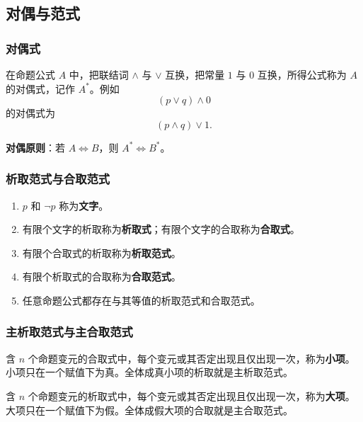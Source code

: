 \subsection{对偶与范式}

\subsubsection{对偶式}

在命题公式 \(A\) 中，把联结词 \(\land\) 与 \(\lor\) 互换，把常量 \(1\) 与 \(0\) 互换，所得公式称为 \(A\) 的对偶式，记作 \(A^*\)。例如
\[
(p\lor q)\land0
\]
的对偶式为
\[
(p\land q)\lor1.
\]

\textbf{对偶原则}：若 \(A\Leftrightarrow B\)，则 \(A^*\Leftrightarrow B^*\)。

\subsubsection{析取范式与合取范式}

\begin{enumerate}
	\item \(p\) 和 \(\neg p\) 称为\textbf{文字}。
	\item 有限个文字的析取称为\textbf{析取式}；有限个文字的合取称为\textbf{合取式}。
	\item 有限个合取式的析取称为\textbf{析取范式}。
	\item 有限个析取式的合取称为\textbf{合取范式}。
	\item 任意命题公式都存在与其等值的析取范式和合取范式。
\end{enumerate}

\subsubsection{主析取范式与主合取范式}

含 \(n\) 个命题变元的合取式中，每个变元或其否定出现且仅出现一次，称为\textbf{小项}。小项只在一个赋值下为真。全体成真小项的析取就是主析取范式。

含 \(n\) 个命题变元的析取式中，每个变元或其否定出现且仅出现一次，称为\textbf{大项}。大项只在一个赋值下为假。全体成假大项的合取就是主合取范式。

